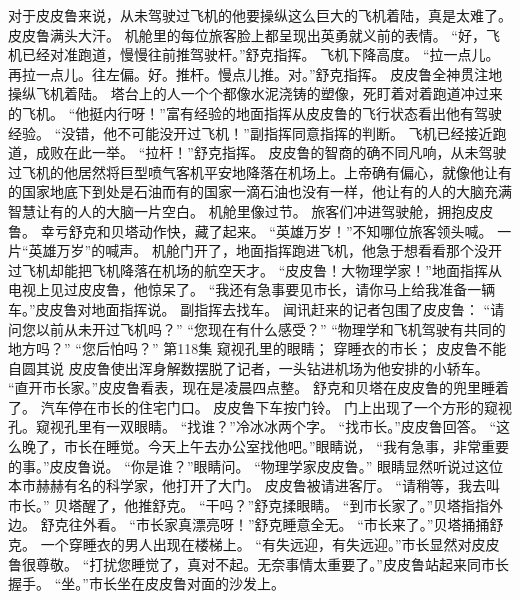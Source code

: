 \documentclass[a4paper,12pt,UTF8,twoside]{ctexbook}
\begin{document}
        对于皮皮鲁来说，从未驾驶过飞机的他要操纵这么巨大的飞机着陆，真是太难了。皮皮鲁满头大汗。 
        机舱里的每位旅客脸上都呈现出英勇就义前的表情。 
        “好，飞机已经对准跑道，慢慢往前推驾驶杆。”舒克指挥。 
        飞机下降高度。 
        “拉一点儿。再拉一点儿。往左偏。好。推杆。慢点儿推。对。”舒克指挥。 
        皮皮鲁全神贯注地操纵飞机着陆。 
        塔台上的人一个个都像水泥浇铸的塑像，死盯着对着跑道冲过来的飞机。 
        “他挺内行呀！”富有经验的地面指挥从皮皮鲁的飞行状态看出他有驾驶经验。 
        “没错，他不可能没开过飞机！”副指挥同意指挥的判断。 
        飞机已经接近跑道，成败在此一举。 
        “拉杆！”舒克指挥。 
        皮皮鲁的智商的确不同凡响，从未驾驶过飞机的他居然将巨型喷气客机平安地降落在机场上。上帝确有偏心，就像他让有的国家地底下到处是石油而有的国家一滴石油也没有一样，他让有的人的大脑充满智慧让有的人的大脑一片空白。 
        机舱里像过节。 
        旅客们冲进驾驶舱，拥抱皮皮鲁。 
        幸亏舒克和贝塔动作快，藏了起来。 
        “英雄万岁！”不知哪位旅客领头喊。 
        一片“英雄万岁”的喊声。 
        机舱门开了，地面指挥跑进飞机，他急于想看看那个没开过飞机却能把飞机降落在机场的航空天才。 
        “皮皮鲁！大物理学家！”地面指挥从电视上见过皮皮鲁，他惊呆了。 
        “我还有急事要见市长，请你马上给我准备一辆车。”皮皮鲁对地面指挥说。 
        副指挥去找车。 
        闻讯赶来的记者包围了皮皮鲁： 
        “请问您以前从未开过飞机吗？” 
        “您现在有什么感受？” 
        “物理学和飞机驾驶有共同的地方吗？” 
        “您后怕吗？”   第118集 
        窥视孔里的眼睛； 
        穿睡衣的市长； 
        皮皮鲁不能自圆其说   
        皮皮鲁使出浑身解数摆脱了记者，一头钻进机场为他安排的小轿车。 
        “直开市长家。”皮皮鲁看表，现在是凌晨四点整。 
        舒克和贝塔在皮皮鲁的兜里睡着了。 
        汽车停在市长的住宅门口。 
        皮皮鲁下车按门铃。 
        门上出现了一个方形的窥视孔。窥视孔里有一双眼睛。 
        “找谁？”冷冰冰两个字。 
        “找市长。”皮皮鲁回答。 
        “这么晚了，市长在睡觉。今天上午去办公室找他吧。”眼睛说， 
        “我有急事，非常重要的事。”皮皮鲁说。 
        “你是谁？”眼睛问。 
        “物理学家皮皮鲁。” 
        眼睛显然听说过这位本市赫赫有名的科学家，他打开了大门。 
        皮皮鲁被请进客厅。 
        “请稍等，我去叫市长。” 
        贝塔醒了，他推舒克。 
        “干吗？”舒克揉眼睛。 
        “到市长家了。”贝塔指指外边。 
        舒克往外看。 
        “市长家真漂亮呀！”舒克睡意全无。 
        “市长来了。”贝塔捅捅舒克。 
        一个穿睡衣的男人出现在楼梯上。 
        “有失远迎，有失远迎。”市长显然对皮皮鲁很尊敬。 
        “打扰您睡觉了，真对不起。无奈事情太重要了。”皮皮鲁站起来同市长握手。 
        “坐。”市长坐在皮皮鲁对面的沙发上。 
\end{document}
